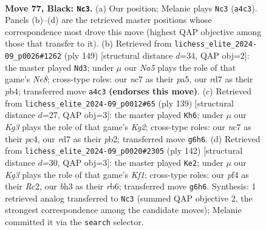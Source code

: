 \documentclass[11pt]{article}
\begin{document}
\clearpage

\begin{figure}[p]\centering
\begin{subfigure}{0.46\textwidth}\centering
\resizebox{\linewidth}{!}{%
\newchessgame
\chessboard[
  setfen={8/PbNR4/6k1/8/np3P2/6PB/5K1P/8 b - - 23 77},
  showmover=false,
  pgfstyle=straightmove, color=movearrow, markmove={a4-c3}
]}
\caption{}
\end{subfigure}\hfill
\begin{subfigure}{0.46\textwidth}\centering
\resizebox{\linewidth}{!}{%
\newchessgame
\chessboard[
  setfen={6k1/8/4p3/Pp6/1P2P3/6NK/3r4/4n3 b - - 1 75},
  showmover=false,
  pgfstyle=straightmove, color=movearrow, markmove={e1-d3}
]}
\caption{}
\end{subfigure}
\\[4pt]
\begin{subfigure}{0.46\textwidth}\centering
\resizebox{\linewidth}{!}{%
\newchessgame
\chessboard[
  setfen={8/2K3k1/3PB3/4P3/2P5/P4b2/1P6/8 b - - 0 70},
  showmover=false,
  pgfstyle=straightmove, color=movearrow, markmove={g7-h6}
]}
\caption{}
\end{subfigure}\hfill
\begin{subfigure}{0.46\textwidth}\centering
\resizebox{\linewidth}{!}{%
\newchessgame
\chessboard[
  setfen={8/8/1r1b2p1/8/3k1pB1/4pP2/2R5/5K2 w - - 4 72},
  showmover=false,
  pgfstyle=straightmove, color=movearrow, markmove={f1-e2}
]}
\caption{}
\end{subfigure}
\caption{\textbf{Move 77, Black: \texttt{Nc3}.} (a) Our position; Melanie plays \texttt{Nc3} (\texttt{a4c3}). Panels (b)--(d) are the retrieved master positions whose correspondence most drove this move (highest QAP objective among those that transfer to it). (b) Retrieved from \texttt{lichess\_elite\_2024-09\_p0026\#1262} (ply 149) [structural distance $d$=34, QAP obj=2]: the master played \texttt{Nd3}; under $\mu$ our \emph{Na5} plays the role of that game's \emph{Ne8}; cross-type roles: our \emph{n}c7 as their \emph{p}a5, our \emph{r}d7 as their \emph{p}b4; transferred move \texttt{a4c3} \textbf{(endorses this move)}. (c) Retrieved from \texttt{lichess\_elite\_2024-09\_p0012\#65} (ply 139) [structural distance $d$=27, QAP obj=3]: the master played \texttt{Kh6}; under $\mu$ our \emph{Kg3} plays the role of that game's \emph{Kg2}; cross-type roles: our \emph{n}c7 as their \emph{p}c4, our \emph{r}d7 as their \emph{p}b2; transferred move \texttt{g6h6}. (d) Retrieved from \texttt{lichess\_elite\_2024-09\_p0020\#2305} (ply 142) [structural distance $d$=30, QAP obj=3]: the master played \texttt{Ke2}; under $\mu$ our \emph{Kg3} plays the role of that game's \emph{Kf1}; cross-type roles: our \emph{p}f4 as their \emph{R}c2, our \emph{b}h3 as their \emph{r}b6; transferred move \texttt{g6h6}. Synthesis: 1 retrieved analog transferred to \texttt{Nc3} (summed QAP objective 2, the strongest correspondence among the candidate moves); Melanie committed it via the \texttt{search} selector.}
\label{fig:thought-m153}
\end{figure}
\end{document}
